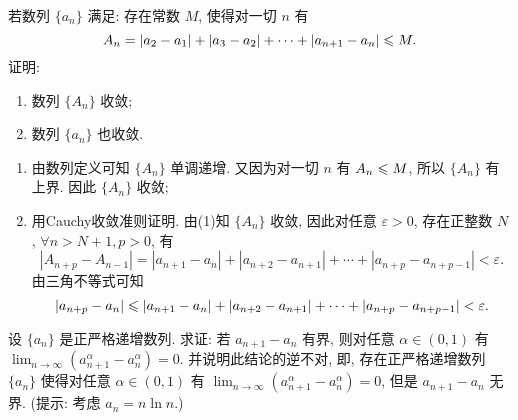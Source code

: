 \begin{exercise}[1.C.5]
    若数列 $\{a_n\}$ 满足: 存在常数 $M$,  使得对一切 $n$ 有
    $$ A_n = |a_2-a_1| + |a_3-a_2| + \cdots + |a_{n+1}-a_n| \leqslant M. $$
    证明:
    \begin{enumerate}[(1)]
        \item 数列 $\{A_n\}$ 收敛;
        \item 数列 $\{a_n\}$ 也收敛.
    \end{enumerate}
\end{exercise}

\begin{solution}
    \begin{enumerate}[(1)]
        \item 由数列定义可知 $\{A_n\}$ 单调递增. 又因为对一切 $n$ 有 $A_n \leqslant M$,  所以 $\{A_n\}$ 有上界. 因此 $\{A_n\}$ 收敛;
        \item 用Cauchy收敛准则证明. 由(1)知 $\{A_n\}$ 收敛,  因此对任意 $\varepsilon > 0$,  存在正整数 $N$,  $\forall n > N+1,  p > 0$,  有
              $$ |A_{n+p} - A_{n-1}| = |a_{n+1}-a_n| + |a_{n+2}-a_{n+1}| + \cdots + |a_{n+p}-a_{n+p-1}| < \varepsilon. $$
              由三角不等式可知
              $$ |a_{n+p} - a_n| \leqslant |a_{n+1}-a_n| + |a_{n+2}-a_{n+1}| + \cdots + |a_{n+p}-a_{n+p-1}| < \varepsilon. $$
    \end{enumerate}
\end{solution}

\begin{exercise}[1.C.6]
    设 $\{a_n\}$ 是正严格递增数列. 求证: 若 $a_{n+1}-a_n$ 有界,  则对任意 $\alpha \in (0, 1)$ 有 $\lim_{n \to \infty} (a_{n+1}^\alpha - a_n^\alpha) = 0$. 并说明此结论的逆不对,  即,  存在正严格递增数列 $\{a_n\}$ 使得对任意 $\alpha \in (0, 1)$ 有 $\lim_{n \to \infty} (a_{n+1}^\alpha - a_n^\alpha) = 0$,  但是 $a_{n+1}-a_n$ 无界. (提示: 考虑 $a_n = n\ln n$.)
\end{exercise}

